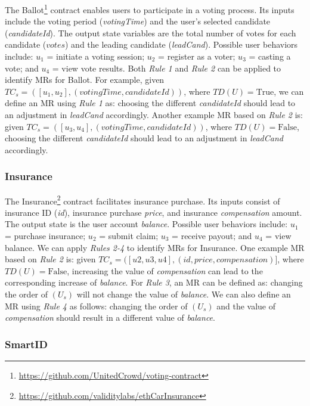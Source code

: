 The Ballot\footnote{\url{https://github.com/UnitedCrowd/voting-contract}} contract enables users to participate in a voting process. Its inputs include the voting period (\textit{votingTime}) and the user's selected candidate (\textit{candidateId}). The output state variables are the total number of votes for each candidate (\(votes\)) and the leading candidate (\textit{leadCand}). Possible user behaviors include: \(u_1\) = initiate a voting session; \(u_2\) = register as a voter; \(u_3\) = casting a vote; and \(u_4\) = view vote results. Both \textit{Rule 1} and \textit{Rule 2} can be applied to identify MRs for Ballot. For example, given \(TC_s = ([u_1, u_2], (votingTime, candidateId))\), where \(TD(U) = \text{True}\), we can define an MR using \textit{Rule 1} as: choosing the different \textit{candidateId} should lead to an adjustment in \textit{leadCand} accordingly. Another example MR based on \textit{Rule 2} is: given \(TC_s = ([u_3, u_4], (votingTime, candidateId))\), where \(TD(U) = \text{False}\), choosing the different \textit{candidateId} should lead to an adjustment in \textit{leadCand} accordingly.

\subsubsection{Insurance}

The Insurance\footnote{\url{https://github.com/validitylabs/ethCarInsurance}} contract facilitates insurance purchase. Its inputs consist of insurance ID (\textit{id}), insurance purchase \textit{price}, and insurance \textit{compensation} amount. The output state is the user account \textit{balance}. Possible user behaviors include: \(u_1\) = purchase insurance; \(u_2\) = submit claim; \(u_3\) = receive payout; and \(u_4\) = view balance. We can apply \textit{Rules 2-4} to identify MRs for Insurance. One example MR based on \textit{Rule 2} is: given \(TC_s = ([u2,u3,u4],(id, price, compensation)]\), where \(TD(U) = \text{False}\), increasing the value of \textit{compensation} can lead to the corresponding increase of \textit{balance}. For \textit{Rule 3}, an MR can be defined as: changing the order of \((U_s)\) will not change the value of \textit{balance}. We can also define an MR using \textit{Rule 4} as follows: changing the order of \((U_s)\) and the value of \textit{compensation} should result in a different value of \textit{balance}.

\subsubsection{SmartID}

